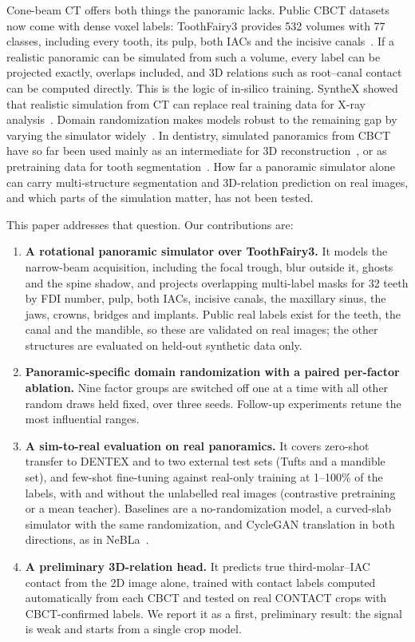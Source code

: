 \documentclass[preprint,12pt]{elsarticle}
\begin{document}
Cone-beam CT offers both things the panoramic lacks. Public CBCT datasets now come with dense voxel labels: ToothFairy3
provides 532 volumes with 77 classes, including every tooth, its pulp, both IACs and the incisive
canals~\cite{toothfairy3,cipriano2022}. If a realistic panoramic can be simulated from such a volume, every label can be
projected exactly, overlaps included, and 3D relations such as root--canal contact can be computed directly. This is the
logic of in-silico training. SyntheX showed that realistic simulation from CT can replace real training data for X-ray
analysis~\cite{gao2023}. Domain randomization makes models robust to the remaining gap by varying the simulator
widely~\cite{tobin2017,billot2023}. In dentistry, simulated panoramics from CBCT have so far been used mainly as an
intermediate for 3D reconstruction~\cite{song2021,park2024,szczepanski2026,yue2026}, or as pretraining data for tooth
segmentation~\cite{wang2025}. How far a panoramic simulator alone can carry multi-structure segmentation and 3D-relation
prediction on real images, and which parts of the simulation matter, has not been tested.

This paper addresses that question. Our contributions are:
\begin{enumerate}
\item \textbf{A rotational panoramic simulator over ToothFairy3.} It models the narrow-beam acquisition, including the
focal trough, blur outside it, ghosts and the spine shadow, and projects overlapping multi-label masks for 32 teeth by
FDI number, pulp, both IACs, incisive canals, the maxillary sinus, the jaws, crowns, bridges and implants. Public real
labels exist for the teeth, the canal and the mandible, so these are validated on real images; the other structures
are evaluated on held-out synthetic data only.
\item \textbf{Panoramic-specific domain randomization with a paired per-factor ablation.} Nine factor groups are
switched off one at a time with all other random draws held fixed, over three seeds. Follow-up experiments retune the
most influential ranges.
\item \textbf{A sim-to-real evaluation on real panoramics.} It covers zero-shot transfer to DENTEX and to two external
test sets (Tufts and a mandible set), and few-shot fine-tuning against real-only training at 1--100\% of the labels,
with and without the unlabelled real images (contrastive pretraining or a mean teacher). Baselines are a
no-randomization model, a curved-slab simulator with the same randomization, and CycleGAN translation in both
directions, as in NeBLa~\cite{park2024}.
\item \textbf{A preliminary 3D-relation head.} It predicts true third-molar--IAC contact from the 2D image alone,
trained with contact labels computed automatically from each CBCT and tested on real CONTACT crops with CBCT-confirmed
labels. We report it as a first, preliminary result: the signal is weak and starts from a single crop model.
\end{enumerate}
\end{document}
